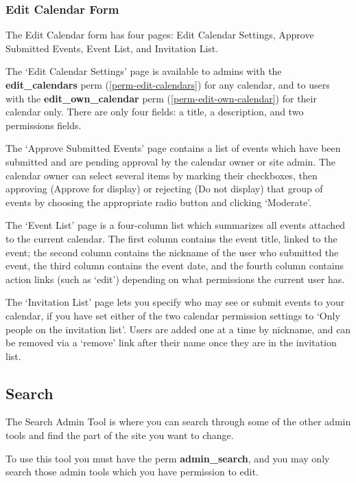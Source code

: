 \subsubsection{Edit Calendar Form}
\label{admin-tools-calendars-edit-form}

The Edit Calendar form has four pages: Edit Calendar Settings, Approve Submitted Events, Event List, and Invitation List.

The `Edit Calendar Settings' page is available to admins with the {\bf edit\_calendars} perm (\ref{perm-edit-calendars}) for any calendar, and to users with the {\bf edit\_own\_calendar} perm (\ref{perm-edit-own-calendar}) for their calendar only. There are only four fields: a title, a description, and two permissions fields.

The `Approve Submitted Events' page contains a list of events which have been submitted and are pending approval by the calendar owner or site admin. The calendar owner can select several items by marking their checkboxes, then approving (Approve for display) or rejecting (Do not display) that group of events by choosing the appropriate radio button and clicking `Moderate'.

The `Event List' page is a four-column list which summarizes all events attached to the current calendar. The first column contains the event title, linked to the event; the second column contains the nickname of the user who submitted the event, the third column contains the event date, and the fourth column contains action links (such as `edit') depending on what permissions the current user has.

The `Invitation List' page lets you specify who may see or submit events to your calendar, if you have set either of the two calendar permission settings to `Only people on the invitation list'. Users are added one at a time by nickname, and can be removed via a `remove' link after their name once they are in the invitation list.

\subsection{Search}
\label{admin-tools-search}

The Search Admin Tool is where you can search through some of the other admin tools and find the part of the site you want to change.

To use this tool you must have the perm {\bf admin\_search}, and you may only search those admin tools which you have permission to edit.

